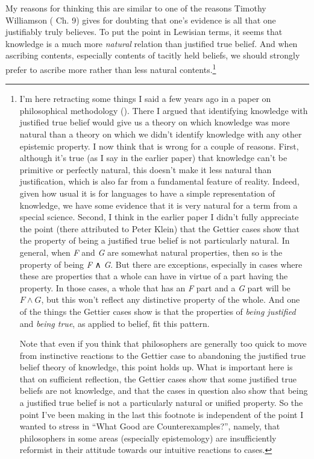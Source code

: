 \documentclass[
  10pt,
  letterpaper,
  DIV=11,
  numbers=noendperiod,
  twoside]{scrartcl}
\begin{document}
My reasons for thinking this are similar to one of the reasons Timothy
Williamson ( Ch. 9)
gives for doubting that one's evidence is all that one justifiably truly
believes. To put the point in Lewisian terms, it seems that knowledge is
a much more \emph{natural} relation than justified true belief. And when
ascribing contents, especially contents of tacitly held beliefs, we
should strongly prefer to ascribe more rather than less natural
contents.\footnote{I'm here retracting some things I said a few years
  ago in a paper on philosophical methodology
  (). There I
  argued that identifying knowledge with justified true belief would
  give us a theory on which knowledge was more natural than a theory on
  which we didn't identify knowledge with any other epistemic property.
  I now think that is wrong for a couple of reasons. First, although
  it's true (as I say in the earlier paper) that knowledge can't be
  primitive or perfectly natural, this doesn't make it less natural than
  justification, which is also far from a fundamental feature of
  reality. Indeed, given how usual it is for languages to have a simple
  representation of knowledge, we have some evidence that it is very
  natural for a term from a special science. Second, I think in the
  earlier paper I didn't fully appreciate the point (there attributed to
  Peter Klein) that the Gettier cases show that the property of being a
  justified true belief is not particularly natural. In general, when
  \emph{F} and \emph{G} are somewhat natural properties, then so is the
  property of being \emph{F} ∧ \emph{G}. But there are exceptions,
  especially in cases where these are properties that a whole can have
  in virtue of a part having the property. In those cases, a whole that
  has an \emph{F} part and a \emph{G} part will be \(F \wedge G\), but
  this won't reflect any distinctive property of the whole. And one of
  the things the Gettier cases show is that the properties of
  \emph{being justified} and \emph{being true}, as applied to belief,
  fit this pattern.

  Note that even if you think that philosophers are generally too quick
  to move from instinctive reactions to the Gettier case to abandoning
  the justified true belief theory of knowledge, this point holds up.
  What is important here is that on sufficient reflection, the Gettier
  cases show that some justified true beliefs are not knowledge, and
  that the cases in question also show that being a justified true
  belief is not a particularly natural or unified property. So the point
  I've been making in the last this footnote is independent of the point
  I wanted to stress in ``What Good are Counterexamples?'', namely, that
  philosophers in some areas (especially epistemology) are
  insufficiently reformist in their attitude towards our intuitive
  reactions to cases.}
\end{document}
